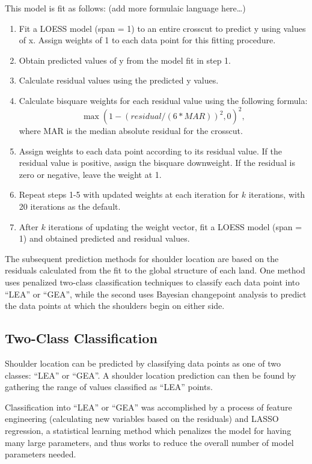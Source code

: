 \documentclass[12pt]{article}
\begin{document}
This model is fit as follows: (add more formulaic language here\ldots{})

\begin{enumerate}

\item Fit a LOESS model (span = 1) to an entire crosscut to predict y using values of x. Assign weights of 1 to each data point for this fitting procedure.  
\item Obtain predicted values of y from the model fit in step 1.  
\item Calculate residual values using the predicted y values.  
\item Calculate bisquare weights for each residual value using the following formula:  
$$\max(1 - (residual/(6*MAR))^2, 0)^2,$$   where MAR is the median absolute residual for the crosscut.  
\item Assign weights to each data point according to its residual value. If the residual value is positive, assign the bisquare downweight. If the residual is zero or negative, leave the weight at 1.  
\item Repeat steps 1-5 with updated weights at each iteration for $k$ iterations, with 20 iterations as the default.  
\item After $k$ iterations of updating the weight vector, fit a LOESS model (span = 1) and obtained predicted and residual values.  

\end{enumerate}

The subsequent prediction methods for shoulder location are based on the
residuals calculated from the fit to the global structure of each land.
One method uses penalized two-class classification techniques to
classify each data point into ``LEA'' or ``GEA'', while the second uses
Bayesian changepoint analysis to predict the data points at which the
shoulders begin on either side.

\subsection{Two-Class Classification}

Shoulder location can be predicted by classifying data points as one of
two classes: ``LEA'' or ``GEA''. A shoulder location prediction can then
be found by gathering the range of values classified as ``LEA'' points.

Classification into ``LEA'' or ``GEA'' was accomplished by a process of
feature engineering (calculating new variables based on the residuals)
and LASSO regression, a statistical learning method which penalizes the
model for having many large parameters, and thus works to reduce the
overall number of model parameters needed.
\end{document}
